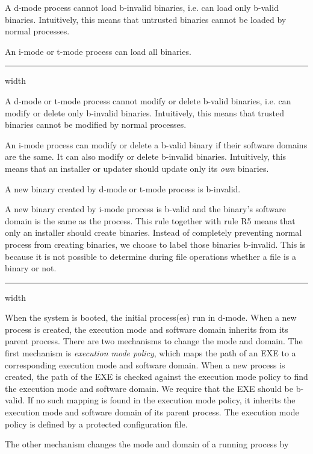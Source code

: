\begin{description}
\setlength{\itemsep}{0pt}
\setlength{\parskip}{0pt}
\setlength{\parsep}{0pt}
\item[R1]
A d-mode process cannot load b-invalid binaries,
i.e. can load only b-valid binaries.
Intuitively, this means that untrusted binaries cannot be loaded
by normal processes.
\item[R2]
An i-mode or t-mode process can load all binaries.
\medskip
\hrule width \textwidth
\medskip
\item[R3]
A d-mode or t-mode process cannot modify or delete b-valid binaries,
i.e. can modify or delete only b-invalid binaries.
Intuitively, this means that trusted binaries cannot be modified
by normal processes.
\item[R4]
An i-mode process can modify or delete a b-valid binary
if their software domains are the same.
It can also modify or delete b-invalid binaries.
Intuitively, this means that an installer or updater should update
only its {\em own} binaries.
\item[R5]
A new binary created by d-mode or t-mode process is b-invalid.
\item[R6]
A new binary created by i-mode process is b-valid and the binary's software domain is
the same as the process.
This rule together with rule R5 means that only an installer
should create binaries.
Instead of completely preventing normal process from creating binaries,
we choose to label those binaries b-invalid. This is because it is
not possible to determine during file operations 
whether a file is a binary or not.
\medskip
\hrule width \textwidth
\medskip
\item[R7]
When the system is booted, the initial process(es) run in d-mode.
When a new process is created, the execution mode and software domain
inherits from its parent process.
There are two mechanisms to change the mode and domain.
The first mechanism is {\em execution mode policy},
which maps the path of an EXE to a corresponding execution mode and software domain.
When a new process is created, the path of the EXE is checked against the
execution mode policy to find the execution mode and software domain.
We require that the EXE should be b-valid.
If no such mapping is found in the execution mode policy, 
it inherits the execution mode and software domain of its parent process.
The execution mode policy is defined by a protected configuration file.
\item[R8]
The other mechanism changes the mode and domain of a running process by

\end{description}
